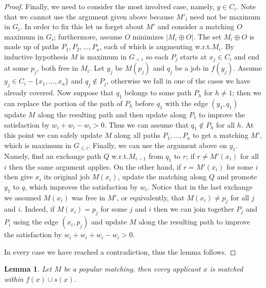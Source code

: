 \documentclass[11pt]{article}
\newcommand{\first}{f}
\newcommand{\second}{s}
\newcommand{\wrt}{{w.r.t.}\xspace}
\newtheorem{lemma}{Lemma}
\begin{document}
\begin{proof}
Finally, we need to consider the most involved case, namely, $y \in C_i$. Note that we cannot use the argument given above because $M'_i$ need not be maximum in $G_i$. In order to fix this let us forget about $M'$ and consider a matching $O$ maximum in $G_i$; furthermore, assume $O$ minimizes $|M_i \oplus O|$. The set $M_i \oplus O$ is made up of paths $P_1, P_2, \ldots, P_a$, each of which is augmenting \wrt $M_i$. By inductive hypothesis $M$ is maximum in $G_{<i}$ so each $P_j$ starts at $x_j \in C_i$ and end at some $p_j$, both free in $M_i$. Let $y_j$ be $M(p_j)$ and $q_j$ be a job in $f(y_j)$. Assume $y_j \in C_i - \{x_1, \ldots,x_a\}$ and $q_j \notin P_j$, otherwise we fall in one of the cases we have already covered. Now suppose that $q_1$ belongs to some path $P_h$ for $h\neq 1$; then we can replace the portion of the path of $P_h$ before $q_1$ with the edge $(y_1,q_1)$ update $M$ along the resulting path and then update along $P_1$ to improve the satisfaction by $w_i + w_i - w_i> 0$. Thus we can assume that $q_1 \notin P_h$ for all $h$. At this point we can safely update $M$ along all paths $P_1, \ldots, P_a$ to get a matching $M'$, which is maximum in $G_{\leq i}$. Finally, we can use the argument above on $y_1$. Namely, find an exchange path $Q$ \wrt $M_{i-1}$ from $q_1$ to $r$; if $r \neq M'(x_i)$ for all $i$ then the same argument applies. On the other hand, if $r = M'(x_i)$ for some $i$ then give $x_i$ its original job $M(x_i)$, update the matching along $Q$ and promote $y_1$ to $q$, which improves the satisfaction by $w_i$. Notice that in the last exchange we assumed $M(x_i)$ was free in $M'$, or equivalently, that $M(x_i) \neq p_j$ for all $j$ and $i$. Indeed, if $M(x_i) = p_j$ for some $j$ and $i$ then we can join together $P_j$ and $P_i$ using the edge $(x_i, p_j)$ and update $M$ along the resulting path to improve the satisfaction by $w_i + w_i + w_i - w_i > 0$.

In every case we have reached a contradiction, thus the lemma follows.
\end{proof}

\begin{lemma} \label{lemma:second-ties} Let $M$ be a popular matching, then every applicant $x$ is matched within $\first(x) \cup \second(x)$.
\end{lemma}
\end{document}
